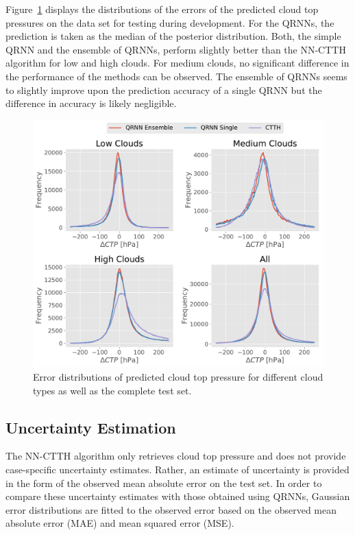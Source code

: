 \documentclass[journal abbreviation, manuscript]{copernicus}
\begin{document}
  Figure~\ref{fig:ctp_results} displays the distributions of the errors of the
  predicted cloud top pressures on the data set for testing during development.
  For the QRNNs, the prediction is taken as the median of the posterior
  distribution. Both, the simple QRNN and the ensemble of QRNNs, perform
  slightly better than the NN-CTTH algorithm for low and high clouds. For medium
  clouds, no significant difference in the performance of the methods can be
  observed. The ensemble of QRNNs seems to slightly improve upon the prediction
  accuracy of a single QRNN but the difference in accuracy is likely negligible.

  \begin{figure}[hbpt!]
    \centering
    \includegraphics[width = 0.8\linewidth]{../plots/ctp_results}
    \caption{Error distributions of predicted cloud top pressure for different cloud types as well as
    the complete test set.}
    \label{fig:ctp_results}
  \end{figure}

\subsection{Uncertainty Estimation}

The NN-CTTH algorithm only retrieves cloud top pressure and does not provide
case-specific uncertainty estimates. Rather, an estimate of uncertainty is
provided in the form of the observed mean absolute error on the test set. In
order to compare these uncertainty estimates with those obtained using QRNNs,
Gaussian error distributions are fitted to the observed error based on the
observed mean absolute error (MAE) and mean squared error (MSE).
\end{document}
